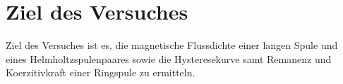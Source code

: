 \section{Ziel des Versuches}
\label{sec:versuchsziel}
Ziel des Versuches ist es, die magnetische Flussdichte einer langen Spule und eines Helmholtzspulenpaares sowie die Hysteresekurve samt Remanenz und Koerzitivkraft einer Ringspule zu ermitteln.  